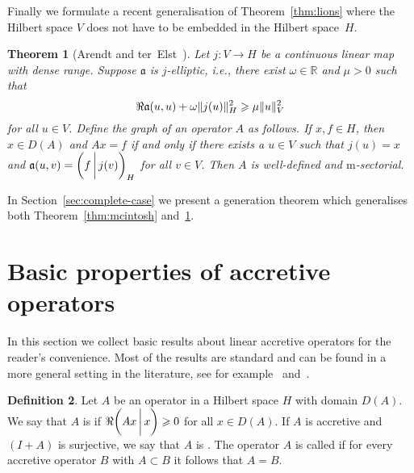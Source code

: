 \documentclass[a4paper,oneside,12pt]{amsart}
\theoremstyle{plain}
\newtheorem{theorem}{Theorem}[section]
\theoremstyle{definition}
\newtheorem{definition}[theorem]{Definition}
\let\ge=\geqslant
\DeclarePairedDelimiter\norm{\lVert}{\rVert}
\begin{document}
Finally we formulate a recent generalisation of Theorem~\ref{thm:lions} where the Hilbert space $V$ does not have to be embedded in the Hilbert space~$H$.
\begin{theorem}[Arendt and ter~Elst~{\cite[Theorem~2.1]{AtE12:sect-form}}]\label{thm:ate}
Let $j\colon V\to H$ be a continuous linear map with dense range. 
Suppose ${{\mathfrak{{a}}}}$ is $j$-elliptic, i.e., there exist $\omega\in{\mathbb{R}}$ and $\mu>0$ such that
\[
    \Re {{\mathfrak{{a}}}}(u,u)+\omega\norm{j(u)}_H^2\ge \mu\norm{u}_V^2
\]
for all $u\in V$. Define the graph of an operator $A$ as follows.
If $x,f\in H$, then $x\in D(A)$ and $Ax=f$ if and only if there exists a $u\in V$
such that $j(u)=x$ and ${{\mathfrak{{a}}}}(u,v)={{\ifthenelse{\equal{auto}{auto}}{\left({f}\mkern3mu{\biggm|}\mkern3mu {j(v)}\right)}{}
\ifthenelse{\equal{auto}{b}}{\bigl({f}\mkern3mu{\biggm|}\mkern3mu {j(v)}\bigr)}{}
\ifthenelse{\equal{auto}{B}}{\Bigl({f}\mkern3mu{\bigm|}\mkern3mu {j(v)}\Bigr)}{}
}}_H$ for all $v\in V$.
Then $A$ is well-defined and {\ensuremath{\text{m}}}-sectorial.
\end{theorem}
In Section~\ref{sec:complete-case} we present a generation theorem which generalises both Theorem~\ref{thm:mcintosh} and~\ref{thm:ate}.

\section{Basic properties of accretive operators}\label{sec:acc-op}

In this section we collect basic results about linear accretive operators for the reader's convenience. 
Most of the results are standard and can be found in a more general setting in the literature, see for example~\cite{Phi69} and~\cite[Chapter~3]{HP97}.

\begin{definition}
Let $A$ be an operator in a Hilbert space $H$ with domain $D(A)$. We say that $A$ is {\textbf{\unboldmath}} if $\Re{{\ifthenelse{\equal{auto}{auto}}{\left({Ax}\mkern3mu{\biggm|}\mkern3mu {x}\right)}{}
\ifthenelse{\equal{auto}{b}}{\bigl({Ax}\mkern3mu{\biggm|}\mkern3mu {x}\bigr)}{}
\ifthenelse{\equal{auto}{B}}{\Bigl({Ax}\mkern3mu{\bigm|}\mkern3mu {x}\Bigr)}{}
}}\ge 0$ for all $x\in D(A)$.
If $A$ is accretive and $(I+A)$ is surjective, we say that $A$ is {\textbf{\unboldmath}}.
The operator $A$ is called {\textbf{\unboldmath}} if for every accretive operator $B$ with $A\subset B$ it follows that $A=B$.
\end{definition}
\end{document}
